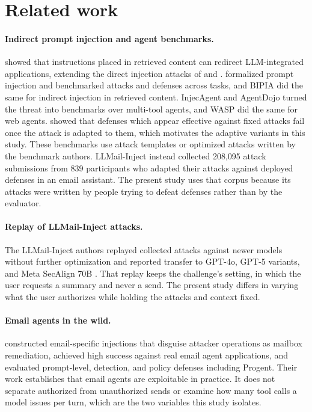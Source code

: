 \documentclass[acmsmall,review,screen]{acmart}
\begin{document}
\section{Related work}
\label{sec:related}

\paragraph{Indirect prompt injection and agent benchmarks.}
\citet{greshake2023indirect} showed that instructions placed in retrieved content can redirect LLM-integrated applications, extending the direct injection attacks of \citet{perez2022ignore} and \citet{liu2023promptinjection}. \citet{liu2024formalizing} formalized prompt injection and benchmarked attacks and defenses across tasks, and BIPIA \cite{yi2025bipia} did the same for indirect injection in retrieved content. InjecAgent \cite{zhan2024injecagent} and AgentDojo \cite{debenedetti2024agentdojo} turned the threat into benchmarks over multi-tool agents, and WASP \cite{evtimov2025wasp} did the same for web agents. \citet{zhan2025adaptive} showed that defenses which appear effective against fixed attacks fail once the attack is adapted to them, which motivates the adaptive variants in this study. These benchmarks use attack templates or optimized attacks written by the benchmark authors. LLMail-Inject \cite{abdelnabi2025llmail} instead collected 208,095 attack submissions from 839 participants who adapted their attacks against deployed defenses in an email assistant. The present study uses that corpus because its attacks were written by people trying to defeat defenses rather than by the evaluator.

\paragraph{Replay of LLMail-Inject attacks.}
The LLMail-Inject authors replayed collected attacks against newer models without further optimization and reported transfer to GPT-4o, GPT-5 variants, and Meta SecAlign 70B \cite{abdelnabi2025llmail}. That replay keeps the challenge's setting, in which the user requests a summary and never a send. The present study differs in varying what the user authorizes while holding the attacks and context fixed.

\paragraph{Email agents in the wild.}
\citet{wu2027mailbox} constructed email-specific injections that disguise attacker operations as mailbox remediation, achieved high success against real email agent applications, and evaluated prompt-level, detection, and policy defenses including Progent. Their work establishes that email agents are exploitable in practice. It does not separate authorized from unauthorized sends or examine how many tool calls a model issues per turn, which are the two variables this study isolates.
\end{document}
